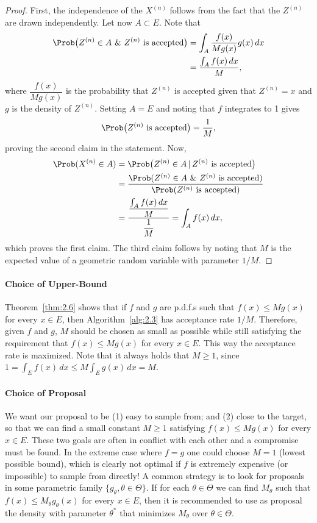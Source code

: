 \begin{proof}
First, the independence of the $X^{(n)}$ follows from the fact that the $Z^{(n)}$ are drawn independently. Let now $A \subset E$. Note that
\begin{align*}
  \Prob\bigl(Z^{(n)} \in A\ \&\ Z^{(n)} \text{ is accepted}\bigr)
  &= \int_A \frac{f(x)}{Mg(x)} g(x)\, dx \\
  &= \frac{\int_A f(x)\, dx}{M},
\end{align*}
where $\dfrac{f(x)}{Mg(x)}$ is the probability that $Z^{(n)}$ is accepted given that $Z^{(n)} = x$ and $g$ is the density of $Z^{(n)}$. Setting $A = E$ and noting that $f$ integrates to 1 gives
\[
  \Prob\bigl(Z^{(n)} \text{ is accepted}\bigr) = \frac{1}{M},
\]
proving the second claim in the statement. Now,
\begin{align*}
  \Prob(X^{(n)} \in A)
  &= \Prob\bigl(Z^{(n)} \in A \,|\, Z^{(n)} \text{ is accepted}\bigr) \\
  &= \frac{\Prob(Z^{(n)} \in A\ \&\ Z^{(n)} \text{ is accepted})}{\Prob(Z^{(n)} \text{ is accepted})} \\
  &= \frac{\dfrac{\int_A f(x)\,dx}{M}}{\dfrac{1}{M}} = \int_A f(x)\, dx,
\end{align*}
which proves the first claim. The third claim follows by noting that $M$ is the expected value of a geometric random variable with parameter $1/M$.
\end{proof}

\paragraph{Choice of Upper-Bound}
Theorem~\ref{thm:2.6} shows that if $f$ and $g$ are p.d.f.s such that $f(x) \le
Mg(x)$ for every $x \in E$, then Algorithm~\ref{alg:2.3} has acceptance rate $1/M$. Therefore, given $f$ and
$g$, $M$ should be chosen as small as possible while still satisfying the requirement that $f(x) \le
Mg(x)$ for every $x \in E$. This way the acceptance rate is maximized. Note that it always holds
that $M \ge 1$, since $1 = \int_E f(x)\, dx \le M \int_E g(x)\, dx = M$.

\paragraph{Choice of Proposal}
We want our proposal to be (1) easy to sample from; and (2) close to the
target, so that we can find a small constant $M \ge 1$ satisfying $f(x) \le Mg(x)$ for every $x \in E$.
These two goals are often in conflict with each other and a compromise must be found. In the
extreme case where $f = g$ one could choose $M = 1$ (lowest possible bound), which is clearly
not optimal if $f$ is extremely expensive (or impossible) to sample from directly! A common
strategy is to look for proposals in some parametric family $\{g_\theta, \theta \in \Theta\}$. If for each $\theta \in \Theta$ we
can find $M_\theta$ such that $f(x) \le M_\theta g_\theta(x)$ for every $x \in E$, then it is recommended to use as
proposal the density with parameter $\theta^*$ that minimizes $M_\theta$ over $\theta \in \Theta$.

